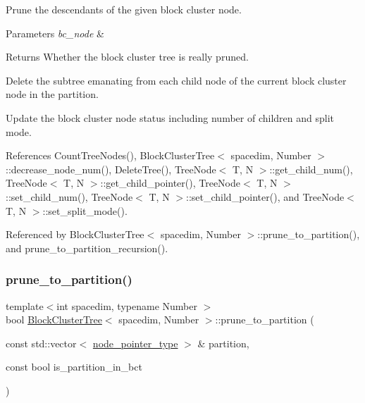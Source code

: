 Prune the descendants of the given block cluster node. 
\begin{DoxyParams}{Parameters}
{\em bc\+\_\+node} & \\
\hline
\end{DoxyParams}
\begin{DoxyReturn}{Returns}
Whether the block cluster tree is really pruned. 
\end{DoxyReturn}
Delete the subtree emanating from each child node of the current block cluster node in the partition.

Update the block cluster node status including number of children and split mode.

References Count\+Tree\+Nodes(), Block\+Cluster\+Tree$<$ spacedim, Number $>$\+::decrease\+\_\+node\+\_\+num(), Delete\+Tree(), Tree\+Node$<$ T, N $>$\+::get\+\_\+child\+\_\+num(), Tree\+Node$<$ T, N $>$\+::get\+\_\+child\+\_\+pointer(), Tree\+Node$<$ T, N $>$\+::set\+\_\+child\+\_\+num(), Tree\+Node$<$ T, N $>$\+::set\+\_\+child\+\_\+pointer(), and Tree\+Node$<$ T, N $>$\+::set\+\_\+split\+\_\+mode().



Referenced by Block\+Cluster\+Tree$<$ spacedim, Number $>$\+::prune\+\_\+to\+\_\+partition(), and prune\+\_\+to\+\_\+partition\+\_\+recursion().

\mbox{\label{classBlockClusterTree_af1663a109b6fd5c67c85e9bb88a54a13}} 
\subsubsection{\texorpdfstring{prune\+\_\+to\+\_\+partition()}{prune\_to\_partition()}}
{\footnotesize\ttfamily template$<$int spacedim, typename Number $>$ \\
bool \hyperlink{classBlockClusterTree}{Block\+Cluster\+Tree}$<$ spacedim, Number $>$\+::prune\+\_\+to\+\_\+partition (\begin{DoxyParamCaption}\item[{const std\+::vector$<$ \hyperlink{classTreeNode}{node\+\_\+pointer\+\_\+type} $>$ \&}]{partition,  }\item[{const bool}]{is\+\_\+partition\+\_\+in\+\_\+bct }\end{DoxyParamCaption})}

